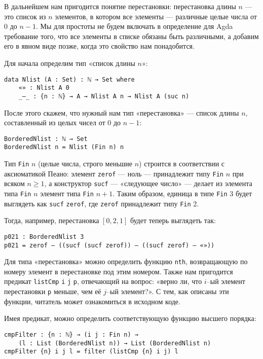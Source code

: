

\abz В дальнейшем нам пригодится понятие перестановки: перестановка длины $n$ — это список из $n$ элементов, в котором все элементы — различные целые числа от 0 до $n-1$. Мы для простоты не будем включать в определение для Agda требование того, что все элементы в списке обязаны быть различными, а добавим его в явном виде позже, когда это свойство нам понадобится.

\abz Для начала определим тип «список длины $n$»:

\begin{verbatim}
data Nlist (A : Set) : ℕ → Set where
    «» : Nlist A 0
    _—_ : {n : ℕ} → A → Nlist A n → Nlist A (suc n)
\end{verbatim}

После этого скажем, что нужный нам тип «перестановка» — список длины $n$, составленный из целых чисел от $0$ до $n-1$:

\begin{verbatim}
BorderedNlist : ℕ → Set
BorderedNlist n = Nlist (Fin n) n
\end{verbatim}

Тип {\tt Fin} $n$ (целые числа, строго меньшие $n$) строится в соответствии с аксиоматикой Пеано: элемент {\tt zerof} — ноль — принадлежит типу {\tt Fin} $n$ при всяком $n \ge 1$, а конструктор {\tt sucf} — «следующее число» — делает из элемента типа {\tt Fin} $n$ элемент типа {\tt Fin} $n+1$. Таким образом, единица в типе {\tt Fin} 3 \linebreak будет выглядеть как {\tt sucf} {\tt zerof}, где {\tt zerof} принадлежит типу {\tt Fin} 2.

\abz Тогда, например, перестановка $[0,2,1]$ будет теперь выглядеть так:

\begin{verbatim}
p021 : BorderedNlist 3
p021 = zerof — ((sucf (sucf zerof)) — ((sucf zerof) — «»))
\end{verbatim}

Для типа «перестановка» можно определить функцию {\tt nth}, возвращающую по номеру элемент в перестановке под этим номером. Также нам пригодится предикат {\tt listCmp} {\tt i} {\tt j} {\tt p}, отвечающий на вопрос: «верно ли, что $i$--ый элемент перестановки {\tt p} меньше, чем её $j$--ый элемент?». С тем, как описаны эти функции, читатель может ознакомиться в исходном коде.

\abz Имея предикат, можно определить соответствующую функцию высшего порядка:

\begin{verbatim}
cmpFilter : {n : ℕ} → (i j : Fin n) →
    (l : List (BorderedNlist n)) → List (BorderedNlist n)
cmpFilter {n} i j l = filter (listCmp {n} i j) l
\end{verbatim}